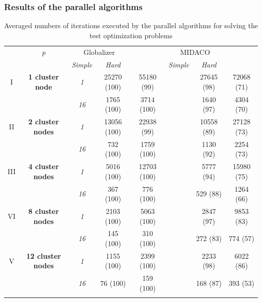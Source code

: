 \documentclass[aspectratio=1610]{beamer}
\begin{document}
\begin{frame}
  \frametitle{Results of the parallel algorithms}
  \begin{table}
    \centering
    \caption{Averaged numbers of iterations executed by the parallel algorithms for solving the test
  optimization problems}
    \label{tab:iterations}
    \begin{tabular}{cccccccc}
      \cline{3-8}\noalign{\smallskip}
      \multicolumn{2}{c}{  } & \textit{p} & \multicolumn{2}{c}{Globalizer} & &
  \multicolumn{2}{c}{MIDACO}   \\
      \noalign{\smallskip} \cline{4-5} \cline{7-8}  \noalign{\smallskip}
      \multicolumn{2}{c}{  } & & \textit{Simple} & \textit{Hard} & & \textit{Simple} &
  \textit{Hard}  \\
      \noalign{\smallskip}\hline
      I & \textbf{1 cluster node}
        & \textit{1} &   25270 (100)  & 55180 (99) & & 27645 (98) & 72068 (71)  \\
      &  & \textit{16} & 1765 (100)  & 3714 (100) & &  1640 (97) & 4304 (70) \\
      \hline \noalign{\smallskip}
  II  & \textbf{2 cluster nodes}  %
    & \textit{1} & 13056 (100) & 22938 (99) & & 10558 (89) & 27128 (73) \\
  &   & \textit{16} & 732 (100) & 1759 (100)  &  & 1130 (92) & 2254 (73) \\
      \hline \noalign{\smallskip}
  III & \textbf{4 cluster nodes} %
    & \textit{1}  & 5016 (100) & 12703 (100) & & 5777 (94) & 15980 (75) \\
  & & \textit{16} & 367 (100) & 776 (100) & & 529 (88) &  1264 (66) \\
      \hline \noalign{\smallskip}
  VI & \textbf{8 cluster nodes} %
    & \textit{1}  & 2103 (100) & 5063 (100) & & 2847 (97) & 9853 (83)\\
  & & \textit{16} & 145 (100)  & 310 (100)  & & 272 (83) & 774 (57)\\
      \hline \noalign{\smallskip}
  V & \textbf{12 cluster nodes} %
    & \textit{1}  & 1155 (100) & 2399 (100) & & 2233 (98) & 6022 (86) \\
  & & \textit{16} & 76 (100)  & 159 (100)  & & 168 (87) & 393 (53)\\
      \noalign{\smallskip}\hline
    \end{tabular}
  \end{table}
\end{frame}
\end{document}
